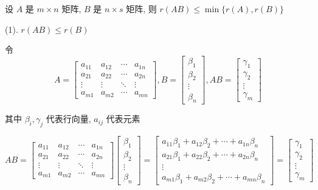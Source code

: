 \begin{proposition}
	设 $A$ 是 $m\times n$ 矩阵, $B$ 是 $n\times s$ 矩阵, 则 $r(AB)\leq \min\{r(A),r(B)\}$
\end{proposition}
\begin{anymark}[证明]
	(1). $r(AB) \leq r(B)$

	令 
	$$A  = \begin{bmatrix}
		a_{11} & a_{12} & \cdots & a_{1n}\\
		a_{21} & a_{22} & \cdots & a_{2n}\\
		\vdots & \vdots & \ddots & \vdots\\
		a_{m1} & a_{m2} & \cdots & a_{mn}
	\end{bmatrix}, 
	B =  \begin{bmatrix}
		\beta_{1} \\ \beta_{2} \\ \vdots \\ \beta_{n}
	\end{bmatrix},
	AB = \begin{bmatrix}
		\gamma_{1} \\ \gamma_{2} \\ \vdots \\ \gamma_{m}
	\end{bmatrix}$$

	其中 $\beta_{i}, \gamma_{j}$ 代表行向量, $a_{ij}$ 代表元素

	$$AB = 
	\begin{bmatrix}
		a_{11} & a_{12} & \cdots & a_{1n}\\
		a_{21} & a_{22} & \cdots & a_{2n}\\
		\vdots & \vdots & \ddots & \vdots\\
		a_{m1} & a_{m2} & \cdots & a_{mn}
	\end{bmatrix}
	\begin{bmatrix}
		\beta_{1} \\ \beta_{2} \\ \vdots \\ \beta_{n}
	\end{bmatrix} = 
	\begin{bmatrix}
		a_{11}\beta_{1}+a_{12}\beta_{2}+\cdots+a_{1n}\beta_{n}\\
		a_{21}\beta_{1}+a_{22}\beta_{2}+\cdots+a_{2n}\beta_{n}\\
		\vdots\\
		a_{m1}\beta_{1}+a_{m2}\beta_{2}+\cdots+a_{mn}\beta_{n}
	\end{bmatrix} = 
	\begin{bmatrix}
		\gamma_{1} \\ \gamma_{2} \\ \vdots \\ \gamma_{m}
	\end{bmatrix}$$


\end{anymark}
